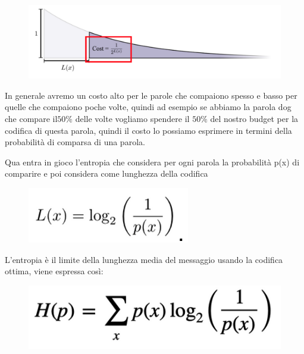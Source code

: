 \documentclass[14pt]{extreport}
\begin{document}
\begin{figure}[H]
	\centering
	\includegraphics[width=0.7\linewidth]{598.jpeg}
\end{figure}


In generale avremo un costo alto per le parole che compaiono spesso e basso per quelle che compaiono poche volte, quindi ad esempio se abbiamo la
parola dog che compare il$50\%$ delle volte vogliamo spendere il $50\%$ del nostro budget per la codifica di questa parola, quindi il costo lo
possiamo esprimere in termini della probabilità di comparsa di una parola.

Qua entra in gioco l’entropia che considera per ogni parola la probabilità p(x) di comparire e poi considera come lunghezza della codifica

\begin{figure}[H]
	\centering
	\includegraphics[width=0.7\linewidth]{599.jpeg}
\end{figure}

L’entropia è il limite della lunghezza media del messaggio usando la codifica ottima, viene espressa così:

\begin{figure}[H]
	\centering
	\includegraphics[width=0.7\linewidth]{600.jpeg}
\end{figure}
\end{document}
